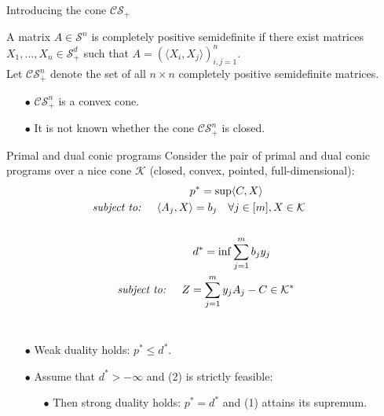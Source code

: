 \documentclass[13.5pt]{beamer}
\begin{document}
\begin{frame}{Introducing the cone $\mathcal{CS}_+$}
\begin{definition}
A matrix $A\in \mathcal{S}^n$ is completely positive semidefinite if there exist matrices $X_1, \ldots, X_n \in \mathcal{S}_+^d$ such that $A= (\langle X_i, X_j \rangle )_{i,j=1}^n$.\\ \vspace*{2mm}
Let $\mathcal{CS}_+^n$ denote the set of all $n \times n$ completely positive semidefinite matrices.
\end{definition}
\pause
\begin{itemize}
\item[$\bullet$] $\mathcal{CS}_+^n$ is a convex cone.
\item[$\bullet$] It is not known whether the cone $\mathcal{CS}_+^n$ is closed.
\end{itemize}

\end{frame}

\begin{frame}{Primal and dual conic programs}
Consider the pair of primal and dual conic programs over a nice cone $\mathcal{K}$ (closed, convex, pointed, full-dimensional):
\pause
\begin{align} 
		\begin{alignedat}{2}  \label{prog_primal}
		& & &  \qquad \quad p^* = \sup \langle C,X \rangle  \\
		& \textit{subject to: }& \quad   &\begin{aligned}[t] \langle A_j,X \rangle &= b_j &  &\forall j \in [m],X\in \mathcal{K}
		\end{aligned} 
		\end{alignedat}
		 \\  \notag \\ 
		\begin{alignedat}{2}  \label{prog_dual}
		& & &   \quad d^* = \inf \sum \limits_{j=1}^m b_jy_j  \\
		& \textit{subject to: }& \quad   &\begin{aligned}[t] Z &= \sum_{j=1}^m y_jA_j - C \in \mathcal{K}^* &  &
		\end{aligned}
		\end{alignedat}
	\end{align} \\
\pause
\begin{itemize}
\item[$\bullet$] Weak duality holds: $p^* \leq d^*$.
\item[$\bullet$] Assume that $d^* > - \infty$ and (2) is strictly feasible:
\begin{itemize}
\item[$\bullet$] Then strong duality holds: $p^* = d^*$ and (1) attains its supremum.
\end{itemize}

\end{itemize}
\end{frame}
\end{document}
